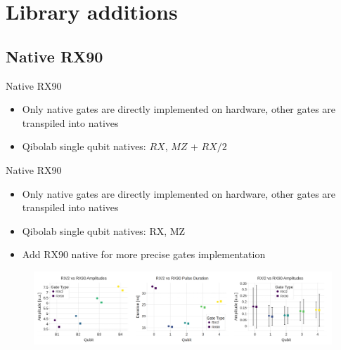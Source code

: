 \documentclass[aspectratio=169,10pt]{beamer}
\begin{document}
%
%

\section{Library additions}
\subsection{Native RX90}

\begin{frame}{Native RX90}
  \begin{itemize}
    \item Only native gates are directly implemented on hardware, other gates are transpiled into natives
    \hspace{10 mm}
    \item Qibolab single qubit natives: $RX$, $MZ$ + $RX/2$
  \end{itemize}
\end{frame}

\begin{frame}{Native RX90}
  \begin{itemize}
    \item Only native gates are directly implemented on hardware, other gates are transpiled into natives
    \hspace{10 mm}
    \item Qibolab single qubit natives: RX, MZ
    \hspace{10 mm}
    \item Add RX90 native for more precise gates implementation
  \end{itemize}
  \begin{figure}
    \centering
    \includegraphics[width=\textwidth]{figures/RX90.png}
  \end{figure}
\end{frame}
\end{document}
